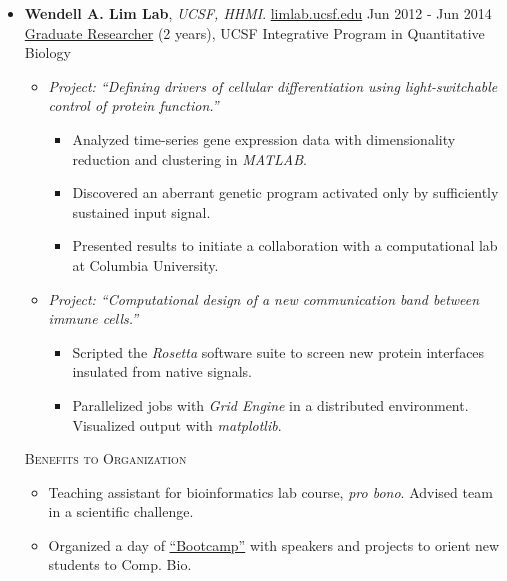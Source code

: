 \documentclass[10pt,letterpaper]{article}
\begin{document}
\begin{minipage}{0.95\textwidth}
    \begin{itemize}
        \item \textbf{Wendell A. Lim Lab}, \emph{UCSF, HHMI}. \href{http://limlab.ucsf.edu}{limlab.ucsf.edu} \hfill{Jun 2012 - Jun 2014}\\
              \underline{Graduate Researcher} (2 years), UCSF Integrative Program in Quantitative Biology
        \begin{itemize}
            \item \emph{Project: ``Defining drivers of cellular differentiation using light-switchable control of protein function.''}
            \begin{itemize}
                \item Analyzed time-series gene expression data with dimensionality reduction and clustering in {\small \textit{MATLAB}}.
                \item Discovered an aberrant genetic program activated only by sufficiently sustained input signal.
                \item Presented results to initiate a collaboration with a computational lab at Columbia University.
            \end{itemize}
            \item \emph{Project: ``Computational design of a new communication band between immune cells.''}
            \begin{itemize}
                \item Scripted the \emph{Rosetta} software suite to screen new protein interfaces insulated from native signals.
                \item Parallelized jobs with \emph{Grid Engine} in a distributed environment. Visualized output with \emph{matplotlib}.
            \end{itemize}
        \end{itemize}
        \textsc{Benefits to Organization}
        \begin{itemize}
            \item Teaching assistant for bioinformatics lab course, \emph{pro bono}. Advised team in a scientific challenge.
            \item Organized a day of \href{https://sites.google.com/site/ipqbbootcamp2012/systems-biology}{``Bootcamp''}
                with speakers and projects to orient new students to Comp. Bio.
        \end{itemize}
    \end{itemize}
\medbreak
\end{minipage}
\end{document}
